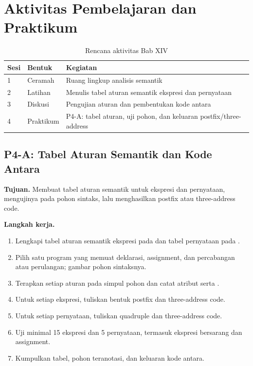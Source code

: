 \section*{Aktivitas Pembelajaran dan Praktikum}

\begin{table}[H]
\centering
\caption{Rencana aktivitas Bab XIV}
\label{tab:ch14-aktivitas}
\begin{tabularx}{\textwidth}{@{}llX@{}}
\toprule
\textbf{Sesi} & \textbf{Bentuk} & \textbf{Kegiatan} \\
\midrule
1 & Ceramah & Ruang lingkup analisis semantik \\
2 & Latihan & Menulis tabel aturan semantik ekspresi dan pernyataan \\
3 & Diskusi & Pengujian aturan dan pembentukan kode antara \\
4 & Praktikum & P4-A: tabel aturan, uji pohon, dan keluaran
postfix/three-address \\
\bottomrule
\end{tabularx}
\end{table}

\subsection*{P4-A: Tabel Aturan Semantik dan Kode Antara}
\textbf{Tujuan.} Membuat tabel aturan semantik untuk ekspresi dan
pernyataan, mengujinya pada pohon sintaks, lalu menghasilkan postfix
atau three-address code.

\textbf{Langkah kerja.}
\begin{enumerate}[label=\arabic*.,leftmargin=*]
  \item Lengkapi tabel aturan semantik ekspresi pada
         dan tabel pernyataan pada
        .
  \item Pilih satu program yang memuat deklarasi, assignment, dan
        percabangan atau perulangan; gambar pohon sintaksnya.
  \item Terapkan setiap aturan pada simpul pohon dan catat atribut
         serta .
  \item Untuk setiap ekspresi, tuliskan bentuk postfix dan
        three-address code.
  \item Untuk setiap pernyataan, tuliskan quadruple dan
        three-address code.
  \item Uji minimal 15 ekspresi dan 5 pernyataan, termasuk ekspresi
        bersarang dan assignment.
  \item Kumpulkan tabel, pohon teranotasi, dan keluaran kode antara.
\end{enumerate}


